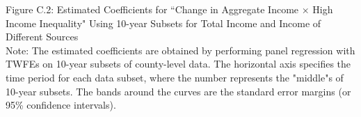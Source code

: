 \documentclass{article}
\begin{document}
\begin{center}
Figure C.2: Estimated Coefficients for ``Change in Aggregate Income $\times$ High Income Inequality" Using 10-year Subsets for Total Income and Income of Different Sources\\
\noindent
{}
Note: The estimated coefficients are obtained by performing panel regression with TWFEs on 10-year subsets of county-level data. The horizontal axis specifies the time period for each data subset, where the number represents the "middle"s of 10-year subsets. The bands around the curves are the standard error margins (or 95\% confidence intervals).
\end{center}
\end{document}
